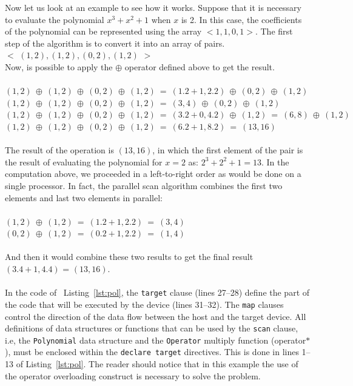 \documentclass[Ingles]{ic-tese-v1}
\newcommand{\ttt}[1]{{\texttt{#1}}}
\newcommand{\rlst}[1]{Listing~\ref{lst:#1}}
\begin{document}
Now let us look at an example to see how it works. Suppose that it is necessary to evaluate the
polynomial $x^{3} + x^{2} + 1$ when $x$ is 2. In this case, the coefficients of the
polynomial can be represented using the array $<1, 1, 0, 1>$. The first step of the
algorithm is to convert it into an array of pairs.\\

$<$ $(1, 2), (1, 2), (0, 2), (1, 2)$ $>$\\

Now, is possible to apply the $\oplus$ operator defined above to get the result.\\\\
$(1, 2)\:\oplus\:(1, 2)\:\oplus\:(0, 2)\:\oplus\:(1, 2)\:=\:(1 . 2 + 1, 2 . 2)\:\oplus\:(0, 2)\: \oplus\:(1, 2)$\\
$(1, 2)\:\oplus\:(1, 2)\:\oplus\:(0, 2)\:\oplus\:(1, 2)\:=\:(3, 4)\:\oplus\:(0, 2)\:\oplus\:(1, 2)$\\
$(1, 2)\:\oplus\:(1, 2)\:\oplus\:(0, 2)\:\oplus\:(1, 2)\:=\:(3. 2 + 0, 4 . 2)\:\oplus\:(1, 2)\:=\:(6, 8)\:\oplus\:(1, 2)$\\
$(1, 2)\:\oplus\:(1, 2)\:\oplus\:(0, 2)\:\oplus\:(1, 2)\:=\:(6 . 2 + 1, 8 . 2) \:=\:(13, 16)$\\\\

The result of the operation is $(13, 16)$, in which the first element of the pair  is the result  of
evaluating the polynomial for $x = 2$  as: $2^{3} + 2^{2} + 1 = 13$.
In the computation above, we proceeded in a left-to-right order as would be
done on a single processor. In fact, the parallel scan algorithm
combines the first two elements and last two elements in parallel:\\\\
$(1, 2) \:\oplus\: (1, 2) \:=\: (1 . 2 + 1, 2 . 2) \:=\: (3, 4)$\\
$(0, 2) \:\oplus\: (1, 2) \:=\: (0 . 2 + 1, 2 . 2) \:=\: (1, 4)$\\\\
And then it would combine these two results to get the final result $(3 . 4 + 1, 4 . 4)$
= $(13, 16)$.
\\\\
In the code of ~\rlst{pol}, the \ttt{target} clause (lines 27--28) define the part of the code
that will  be  executed by  the device  (lines 31--32).  The \ttt{map} clauses control the direction  of the data flow
between the host and the target device. All definitions of data structures
or functions  that can be used  by the \ttt{scan} clause,  i.e, the
\ttt{Polynomial} data  structure and the \ttt{Operator}  multiply function
(operator$*$),  must   be  enclosed  within  the   \ttt{declare  target}
directives. This is done in lines 1--13 of \rlst{pol}.
The reader should notice that in this example the use of the operator overloading
construct is necessary to solve the problem.
\end{document}
